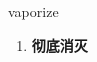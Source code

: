 
\begin{frame}
{\huge vaporize}
\begin{center}
\begin{enumerate}\Large
  \item \textbf{彻底消灭}
\end{enumerate}
\end{center}
\end{frame}
